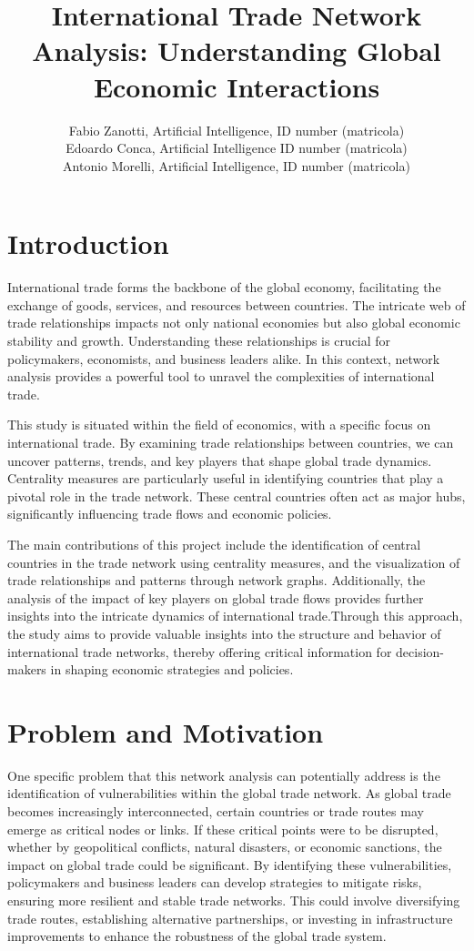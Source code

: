 \documentclass[12pt, a4paper]{article}
\author{Fabio Zanotti, Artificial Intelligence, ID number (matricola)
\\Edoardo Conca,  Artificial Intelligence ID number (matricola)
\\Antonio Morelli, Artificial Intelligence, ID number (matricola)}
\date{}
\title{International Trade Network Analysis: Understanding Global Economic Interactions}
\begin{document}
\maketitle

\section{Introduction}
\label{introduction}

International trade forms the backbone of the global economy, facilitating the exchange of goods, services, and resources between countries. The intricate web of trade relationships impacts not only national economies but also global economic stability and growth. Understanding these relationships is crucial for policymakers, economists, and business leaders alike. In this context, network analysis provides a powerful tool to unravel the complexities of international trade.

This study is situated within the field of economics, with a specific focus on international trade. By examining trade relationships between countries, we can uncover patterns, trends, and key players that shape global trade dynamics. Centrality measures are particularly useful in identifying countries that play a pivotal role in the trade network. These central countries often act as major hubs, significantly influencing trade flows and economic policies.

The main contributions of this project include the identification of central countries in the trade network using centrality measures, and the visualization of trade relationships and patterns through network graphs. Additionally, the analysis of the impact of key players on global trade flows provides further insights into the intricate dynamics of international trade.Through this approach, the study aims to provide valuable insights into the structure and behavior of international trade networks, thereby offering critical information for decision-makers in shaping economic strategies and policies.

\section{Problem and Motivation}
\label{problem-and-motivation}
One specific problem that this network analysis can potentially address is the identification of vulnerabilities within the global trade network. As global trade becomes increasingly interconnected, certain countries or trade routes may emerge as critical nodes or links. If these critical points were to be disrupted, whether by geopolitical conflicts, natural disasters, or economic sanctions, the impact on global trade could be significant. By identifying these vulnerabilities, policymakers and business leaders can develop strategies to mitigate risks, ensuring more resilient and stable trade networks. This could involve diversifying trade routes, establishing alternative partnerships, or investing in infrastructure improvements to enhance the robustness of the global trade system.
\end{document}
